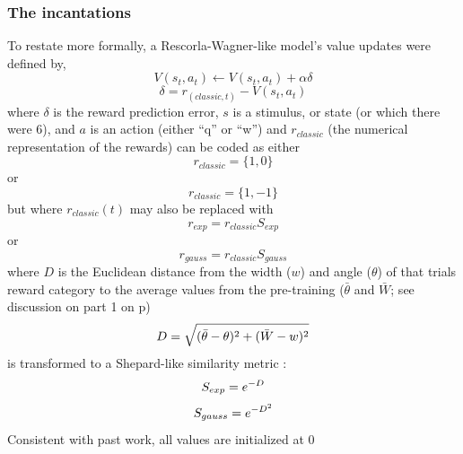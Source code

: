 \subsubsection{The incantations}
\label{subsub:incantations}
To restate more formally, a Rescorla-Wagner-like model's value updates were defined by,
\begin{equation} \label{eq:V} V(s_t,a_t) \leftarrow V(s_t,a_t) + \alpha\delta \end{equation} 
\begin{equation} \label{eq:rpe} \delta = r_{(classic,t)} - V(s_t,a_t) \end{equation}
where $\delta$ is the reward prediction error, $s$ is a stimulus, or state (or which there were 6), and $a$ is an action (either ``q'' or ``w'') and $r_{classic}$ (the numerical representation of the rewards) can be coded as either
\begin{equation}
    \label{eq:r1}
    r_{classic}= \{1,0\}
\end{equation}
or 
\begin{equation}
    \label{eq:r2}
    r_{classic}= \{1,-1\}
\end{equation}
but where $r_{classic}(t)$ may also be replaced with
\begin{equation}
    \label{eq:re}
    r_{exp} = r_{classic}S_{exp}
\end{equation}
or
\begin{equation}
    \label{eq:rg}
    r_{gauss} = r_{classic}S_{gauss}
\end{equation}
where $D$ is the Euclidean distance from the width ($w$) and angle ($\theta$) of that trials reward category to the average values from the pre-training ($\bar{\theta}$ and $\bar{W}$; see discussion on part 1 on p\pageref{subsub:whatwhen})
\begin{equation}
    \label{eq:D}\\
    D = \sqrt{(\bar{\theta} - \theta)^2 + (\bar{W}-w)^2}
\end{equation}
is transformed to a Shepard-like similarity metric \cite{Shepard:1987p9102}:
\begin{equation}
    \label{eq:Sexp}\\
    S_{exp} = e^{-D}
\end{equation}
\begin{equation}
    \label{eq:Sgauss}\\
    S_{gauss} = e^{-D^2}
\end{equation}
Consistent with past work, all values are initialized at 0 \cite{Beierholm:2011p8141,BischoffGrethe:2009p4570,Gershman:2009p7207}
